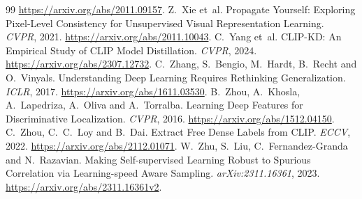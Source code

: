 \documentclass{article}
\begin{document}
\begin{thebibliography}{99}
\url{https://arxiv.org/abs/2011.09157}.
Z.~Xie et~al.
Propagate Yourself: Exploring Pixel-Level Consistency for Unsupervised Visual Representation Learning.
\emph{CVPR}, 2021. \url{https://arxiv.org/abs/2011.10043}.
C.~Yang et~al.
CLIP-KD: An Empirical Study of CLIP Model Distillation. \emph{CVPR}, 2024.
\url{https://arxiv.org/abs/2307.12732}.
C.~Zhang, S.~Bengio, M.~Hardt, B.~Recht and O.~Vinyals.
Understanding Deep Learning Requires Rethinking Generalization. \emph{ICLR}, 2017.
\url{https://arxiv.org/abs/1611.03530}.
B.~Zhou, A.~Khosla, A.~Lapedriza, A.~Oliva and A.~Torralba.
Learning Deep Features for Discriminative Localization. \emph{CVPR}, 2016.
\url{https://arxiv.org/abs/1512.04150}.
C.~Zhou, C.~C.~Loy and B.~Dai.
Extract Free Dense Labels from CLIP. \emph{ECCV}, 2022.
\url{https://arxiv.org/abs/2112.01071}.
W.~Zhu, S.~Liu, C.~Fernandez-Granda and N.~Razavian.
Making Self-supervised Learning Robust to Spurious Correlation via
Learning-speed Aware Sampling. \emph{arXiv:2311.16361}, 2023.
\url{https://arxiv.org/abs/2311.16361v2}.
\end{thebibliography}
\endgroup

\clearpage
\appendix
\end{document}
